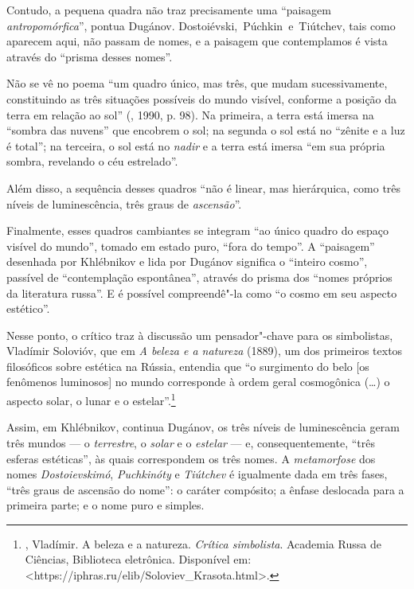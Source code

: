 Contudo, a pequena quadra não traz precisamente uma ``paisagem
\emph{antropomórfica}'', pontua Dugánov. Dostoiévski,~Púchkin~e~Tiútchev, tais como aparecem aqui, não passam de nomes, e a paisagem que
contemplamos é vista através do ``prisma desses nomes''.

Não se vê no poema ``um quadro único, mas três, que
mudam sucessivamente, constituindo as três situações possíveis do mundo
visível, conforme a posição da terra em relação ao sol'' (, 1990, p. 98). Na primeira, a
terra está imersa na ``sombra das nuvens'' que encobrem o sol; na segunda o
sol está no ``zênite e a luz é total''; na terceira, o sol está no \emph{nadir} e a
terra está imersa ``em sua própria sombra, revelando o céu estrelado''.

Além disso, a sequência desses quadros ``não é linear, mas
hierárquica, como três níveis de luminescência, três graus de \emph{ascensão}''.

Finalmente, esses quadros cambiantes se integram ``ao único quadro do
espaço visível do mundo'', tomado em estado puro, ``fora do tempo''. A
``paisagem'' desenhada por Khlébnikov e lida por Dugánov significa o ``inteiro cosmo'', passível de ``contemplação espontânea'', através do prisma dos ``nomes próprios da literatura russa''.
E é possível compreendê"-la como ``o cosmo em seu aspecto estético''.

Nesse ponto, o crítico traz à discussão um pensador"-chave para os
simbolistas, Vladímir Solovióv, que em \emph{A beleza e a natureza} (1889), um dos primeiros textos filosóficos sobre estética na
Rússia, entendia que ``o surgimento do belo [os fenômenos
luminosos] no mundo corresponde à ordem geral cosmogônica (\ldots{}) o aspecto
solar, o lunar e o estelar''.\footnote{, Vladímir. A beleza e a
  natureza. \emph{Crítica simbolista}. Academia Russa de Ciências,
  Biblioteca eletrônica. Disponível em: \textless{}https://iphras.ru/elib/Soloviev\_Krasota.html\textgreater{}.} 

Assim, em Khlébnikov, continua Dugánov, os três níveis de
luminescência geram três mundos --- o \emph{terrestre}, o \emph{solar}
e o \emph{estelar} --- e, consequentemente, ``três esferas estéticas'', às quais
correspondem os três nomes. A \emph{metamorfose} dos nomes \emph{Dostoievskimó},
\emph{Puchkinóty} e \emph{Tiútchev} é igualmente dada em três fases, ``três
graus de ascensão do nome'': o caráter compósito; a ênfase deslocada para a primeira parte; e
o nome puro e simples.

